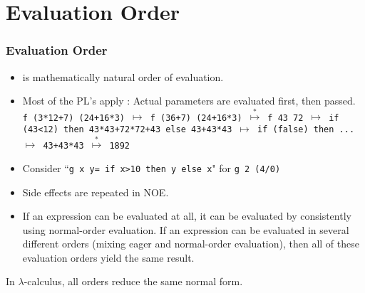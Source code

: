 \section{Evaluation Order}
\begin{frame}
\frametitle{Evaluation Order}
\begin{itemize}
\item {} is mathematically natural order of evaluation.
\item Most of the PL's apply : Actual parameters are evaluated
first, then passed.\\
\texttt{\scriptsize f (3*12+7) (24+16*3) $\mapsto$
	f (36+7) (24+16*3) $\stackrel{*}{\mapsto}$
	f 43 72 $\mapsto$  if (43<12) then 43*43+72*72+43 
                  else 43+43*43 $\mapsto$ if (false) then ... $\mapsto$
	43+43*43 $\stackrel{*}{\mapsto}$ 1892}\hfill {}
\item Consider ``\lstinline!g x y= if x>10 then y else x!"  for \texttt{g 2 (4/0)}
\item Side effects are repeated in NOE.
\item {} {\small\rm
If an expression can be evaluated at all, it can be evaluated by consistently using
normal-order evaluation. If an expression can be evaluated in several different orders
(mixing eager and normal-order evaluation), then all of these evaluation orders yield
the same result.}
\end{itemize}
\end{frame}

\begin{frame}
In $\lambda$-calculus, all orders reduce the same normal form.\\
\tiny
{}
\end{frame}



